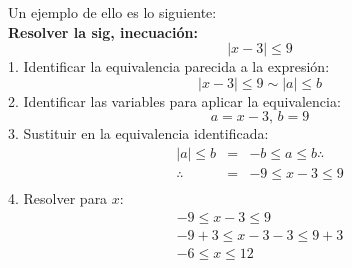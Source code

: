 \documentclass[letterpaper, 12pt]{article}
\begin{document}
        Un ejemplo de ello es lo siguiente:
        \\\newline \textbf{Resolver la sig, inecuación:}
        \[|x-3|\leq 9\]
        1. Identificar la equivalencia parecida a la expresión:
        \[|x-3|\leq 9\sim|a|\leq b\]
        2. Identificar las variables para aplicar la equivalencia:
        \[a=x-3,\, b=9\]
        3. Sustituir en la equivalencia identificada:
        \[\begin{matrix}
            |a|\leq b&=&-b\leq a \leq b\therefore\\
                \therefore&=&-9\leq x-3\leq 9\\
        \end{matrix}\]
        4. Resolver para \(x\):
        \[\begin{matrix}
            -9\leq x-3\leq 9\\
            -9+3\leq x-3-3\leq 9+3\\
            -6\leq x\leq 12
        \end{matrix}\]
\end{document}
